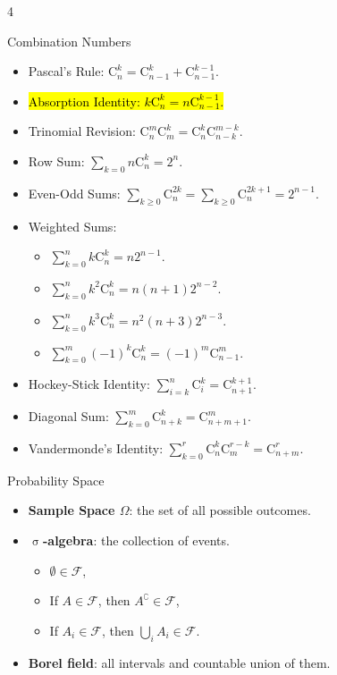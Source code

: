 \documentclass[landscape,a4paper]{article}
\renewcommand{\emph}[1]{\hl{#1}}
\newcommand{\C}[2]{\mathrm{C}_{#1}^{#2}}
\begin{document}
	
	\fontsize{7pt}{8pt}\selectfont 

	
	\begin{multicols*}{4}
		\begin{card}{Combination Numbers}
			\begin{itemize}
				\item Pascal's Rule: $\C{n}{k}=\C{n-1}{k}+\C{n-1}{k-1}$.
				\item \emph{Absorption Identity: $k\C{n}{k}=n\C{n-1}{k-1}$.}
				\item Trinomial Revision: $\C{n}{m}\C{m}{k}=\C{n}{k}\C{n-k}{m-k}$.
				\item Row Sum: $\sum_{k=0}{n}\C{n}{k}=2^n$.
				\item Even-Odd Sums: $\sum_{k\ge 0} \C{n}{2k}=\sum_{k\ge 0}\C{n}{2k+1}=2^{n-1}$.
				\item Weighted Sums:
				\begin{itemize} 
					\item $\sum_{k=0}^{n}k\C{n}{k}=n2^{n-1}$.
				\item $\sum_{k=0}^{n}k^2\C{n}{k}=n(n+1)2^{n-2}$.
				\item  $\sum_{k=0}^{n}k^3\C{n}{k}=n^2(n+3)2^{n-3}$.
				\item  $\sum_{k=0}^m(-1)^k\C{n}{k}=(-1)^m\C{n-1}{m}$.
				\end{itemize}
				\item Hockey-Stick Identity: $\sum_{i=k}^n\C{i}{k}=\C{n+1}{k+1}$.
				\item Diagonal Sum: $\sum_{k=0}^m \C{n+k}{k}=\C{n+m+1}{m}$.
				\item Vandermonde's Identity: $\sum_{k=0}^r \C{n}{k}\C{m}{r-k}=\C{n+m}{r}$.
			\end{itemize}
		\end{card}
		\begin{card}{Probability Space}
			\begin{itemize}
				\item \textbf{Sample Space $\Omega$}: the set of all possible outcomes.
				\item \textbf{$\upsigma$-algebra}: the collection of events.
				\begin{itemize}
					\item $\emptyset\in\mathcal F$,
					\item If $A\in\mathcal F$, then $A^\complement\in \mathcal F$,
					\item If $A_i\in\mathcal F$, then $\bigcup_i A_i\in\mathcal F$.
				\end{itemize}
				\item \textbf{Borel field}: all intervals and countable union of them.

\end{itemize}
\end{card}
\end{multicols*}
\end{document}
